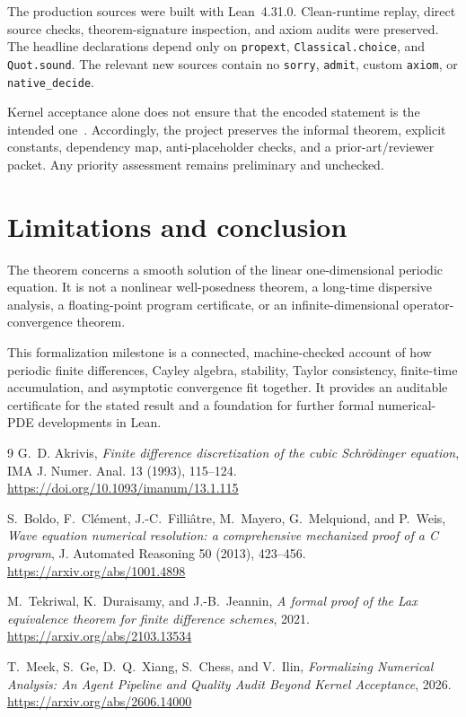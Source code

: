 \documentclass[11pt]{article}
\begin{document}
The production sources were built with Lean~4.31.0.  Clean-runtime replay,
direct source checks, theorem-signature inspection, and axiom audits were
preserved.  The headline declarations depend only on \texttt{propext},
\texttt{Classical.choice}, and \texttt{Quot.sound}.  The relevant new sources
contain no \texttt{sorry}, \texttt{admit}, custom \texttt{axiom}, or
\texttt{native\_decide}.

Kernel acceptance alone does not ensure that the encoded statement is the
intended one~\cite{Meek2026}.  Accordingly, the project preserves the informal
theorem, explicit constants, dependency map, anti-placeholder checks, and a
prior-art/reviewer packet.  Any priority assessment remains preliminary and
unchecked.

\section{Limitations and conclusion}

The theorem concerns a smooth solution of the linear one-dimensional periodic
equation.  It is not a nonlinear well-posedness theorem, a long-time dispersive
analysis, a floating-point program certificate, or an infinite-dimensional
operator-convergence theorem.

This formalization milestone is a connected, machine-checked account of how
periodic finite
differences, Cayley algebra, stability, Taylor consistency, finite-time
accumulation, and asymptotic convergence fit together.  It provides an
auditable certificate for the stated result and a foundation for further
formal numerical-PDE developments in Lean.

\begin{thebibliography}{9}
G.~D. Akrivis, \emph{Finite difference discretization of the cubic
Schr\"odinger equation}, IMA J. Numer. Anal. 13 (1993), 115--124.
\url{https://doi.org/10.1093/imanum/13.1.115}

S.~Boldo, F.~Cl\'ement, J.-C.~Filli\^atre, M.~Mayero, G.~Melquiond, and P.~Weis,
\emph{Wave equation numerical resolution: a comprehensive mechanized proof of
a C program}, J. Automated Reasoning 50 (2013), 423--456.
\url{https://arxiv.org/abs/1001.4898}

M.~Tekriwal, K.~Duraisamy, and J.-B.~Jeannin,
\emph{A formal proof of the Lax equivalence theorem for finite difference
schemes}, 2021. \url{https://arxiv.org/abs/2103.13534}

T.~Meek, S.~Ge, D.~Q.~Xiang, S.~Chess, and V.~Ilin,
\emph{Formalizing Numerical Analysis: An Agent Pipeline and Quality Audit
Beyond Kernel Acceptance}, 2026. \url{https://arxiv.org/abs/2606.14000}
\end{thebibliography}
\end{document}
